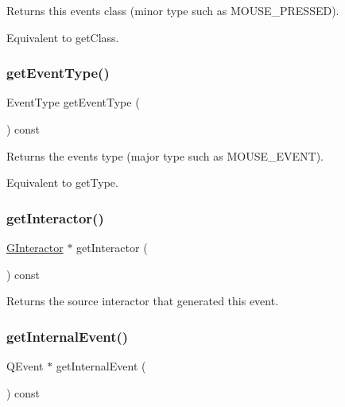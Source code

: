 Returns this event\textquotesingle{}s class (minor type such as M\+O\+U\+S\+E\+\_\+\+P\+R\+E\+S\+S\+ED). 

Equivalent to get\+Class. \mbox{\label{classGEvent_a404fe4b126a8443600109a62ef7ce6a2}} 
\subsubsection{\texorpdfstring{get\+Event\+Type()}{getEventType()}}
{\footnotesize\ttfamily Event\+Type get\+Event\+Type (\begin{DoxyParamCaption}{ }\end{DoxyParamCaption}) const\hspace{0.3cm}{\ttfamily [virtual]}}



Returns the event\textquotesingle{}s type (major type such as M\+O\+U\+S\+E\+\_\+\+E\+V\+E\+NT). 

Equivalent to get\+Type. \mbox{\label{classGEvent_ac8998a7ac699a98fbdc125ef0f3d64f1}} 
\subsubsection{\texorpdfstring{get\+Interactor()}{getInteractor()}}
{\footnotesize\ttfamily \mbox{\hyperlink{classGInteractor}{G\+Interactor}} $\ast$ get\+Interactor (\begin{DoxyParamCaption}{ }\end{DoxyParamCaption}) const\hspace{0.3cm}{\ttfamily [virtual]}}



Returns the source interactor that generated this event. 

\mbox{\label{classGEvent_ab3589ee7d7005f6a323ff2c968f82038}} 
\subsubsection{\texorpdfstring{get\+Internal\+Event()}{getInternalEvent()}}
{\footnotesize\ttfamily Q\+Event $\ast$ get\+Internal\+Event (\begin{DoxyParamCaption}{ }\end{DoxyParamCaption}) const\hspace{0.3cm}{\ttfamily [virtual]}}




